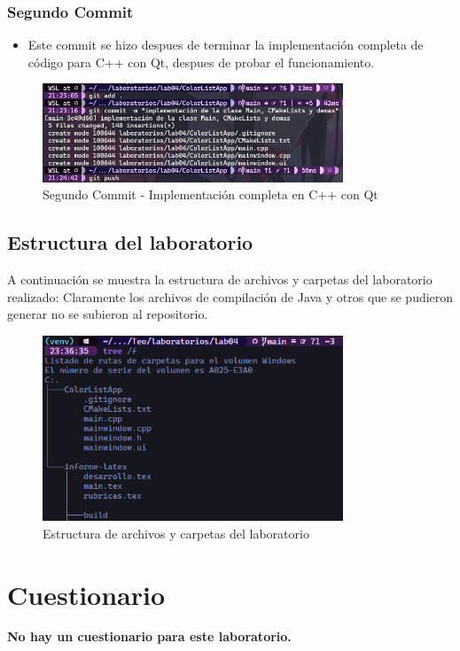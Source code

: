 \subsubsection {Segundo Commit}

\begin{itemize}
    \item Este commit se hizo despues de terminar la implementación completa de código para C++ con Qt, despues de probar el funcionamiento.
\end{itemize}

\begin{figure} [H]
    \centering
    \includegraphics[width=0.8\textwidth]{img/Commit02.png}
    \caption{Segundo Commit - Implementación completa en C++ con Qt}
    \label{fig:commit2}
\end{figure}




\subsection {Estructura del laboratorio}

A continuación se muestra la estructura de archivos y carpetas del laboratorio realizado:
Claramente los archivos de compilación de Java y otros que se pudieron generar no se subieron al repositorio.

\begin{figure}
    \centering
    \includegraphics[width=0.8\textwidth]{img/EstructuraLaboratorio.png}
    \caption{Estructura de archivos y carpetas del laboratorio}
    \label{fig:estructura}
\end{figure}



\section{Cuestionario}

\textbf{No hay un cuestionario para este laboratorio.}





